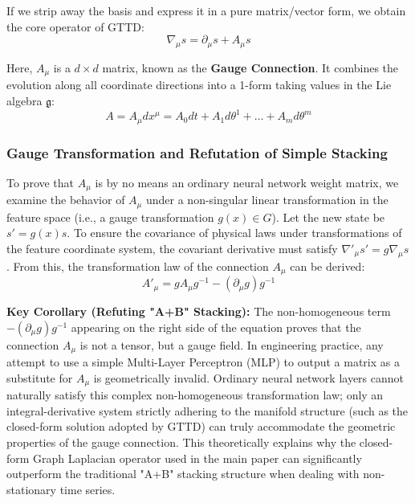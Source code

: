 \documentclass{article}
\begin{document}
If we strip away the basis and express it in a pure matrix/vector form, we obtain the core operator of GTTD:
\begin{equation}
\nabla_\mu s = \partial_\mu s + A_\mu s
\end{equation}

Here, $A_\mu$ is a $d \times d$ matrix, known as the \textbf{Gauge Connection}. It combines the evolution along all coordinate directions into a 1-form taking values in the Lie algebra $\mathfrak{g}$:
\begin{equation}
A = A_\mu dx^\mu = A_0 dt + A_1 d\theta^1 + \dots + A_m d\theta^m
\end{equation}

\subsubsection{Gauge Transformation and Refutation of Simple Stacking}

To prove that $A_\mu$ is by no means an ordinary neural network weight matrix, we examine the behavior of $A_\mu$ under a non-singular linear transformation in the feature space (i.e., a gauge transformation $g(x) \in G$). Let the new state be $s' = g(x) s$. To ensure the covariance of physical laws under transformations of the feature coordinate system, the covariant derivative must satisfy $\nabla'_\mu s' = g \nabla_\mu s$. From this, the transformation law of the connection $A_\mu$ can be derived:
\begin{equation}
A'_\mu = g A_\mu g^{-1} - (\partial_\mu g) g^{-1}
\end{equation}

\noindent\textbf{Key Corollary (Refuting "A+B" Stacking):} The non-homogeneous term $-(\partial_\mu g) g^{-1}$ appearing on the right side of the equation proves that the connection $A_\mu$ is not a tensor, but a gauge field. In engineering practice, any attempt to use a simple Multi-Layer Perceptron (MLP) to output a matrix as a substitute for $A_\mu$ is geometrically invalid. Ordinary neural network layers cannot naturally satisfy this complex non-homogeneous transformation law; only an integral-derivative system strictly adhering to the manifold structure (such as the closed-form solution adopted by GTTD) can truly accommodate the geometric properties of the gauge connection. This theoretically explains why the closed-form Graph Laplacian operator used in the main paper can significantly outperform the traditional "A+B" stacking structure when dealing with non-stationary time series.
\end{document}
